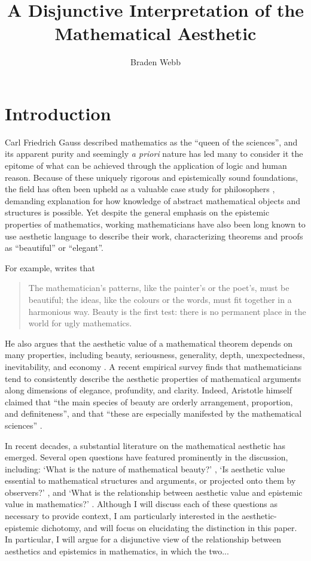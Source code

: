 \documentclass[a4paper,man,natbib]{apa6}
\title{A Disjunctive Interpretation of the Mathematical Aesthetic}
\author{Braden Webb}
\affiliation{Department of Philosophy, Brigham Young University\\
PHIL 495R: Directed Readings in the Philosophy of Mathematics\\
Dr. Derek Haderlie\\
22 April 2023}
\begin{document}
\maketitle

\section{Introduction}
Carl Friedrich Gauss described mathematics as the ``queen of the sciences'', and its apparent purity and 
seemingly \textit{a priori} nature has led many to consider it the epitome of what can be achieved through
the application of logic and human reason. Because of these uniquely rigorous and epistemically sound
foundations, the field has often been upheld as a valuable case study for philosophers \citep{shapiro_thinking_2000},
demanding explanation for how knowledge of abstract mathematical objects and structures is possible. 
Yet despite the general emphasis on the epistemic properties of mathematics, working mathematicians have 
also been long known to use aesthetic language to describe their work, characterizing theorems and proofs as
``beautiful'' or ``elegant''. 

For example, \cite{hardy_mathematicians_1940} writes that
\begin{quotation}
      The mathematician’s patterns, like the painter’s or the poet’s, must be beautiful; the ideas, like the 
      colours or the words, must fit together in a harmonious way. Beauty is the first test: there is no 
      permanent place in the world for ugly mathematics.
\end{quotation}
He also argues that the aesthetic value of a mathematical theorem depends on many properties, including
beauty, seriousness, generality, depth, unexpectedness, inevitability, and 
economy \citep{hardy_mathematicians_1940}. A recent empirical survey \citep{johnson_intuitions_2019} finds that mathematicians
tend to consistently describe the aesthetic properties of mathematical arguments along dimensions of
elegance, profundity, and clarity. Indeed, Aristotle himself claimed that ``the main species of beauty are orderly 
arrangement, proportion, and definiteness'', and that ``these are especially manifested by the mathematical sciences''
\cite[VIII, 1078a]{aristotle_metaphysics_nodate}.

In recent decades, a substantial literature on the mathematical aesthetic has emerged. Several open questions have
featured prominently in the discussion, including: `What is the nature of mathematical beauty?' 
\citep{blasjo_definition_2012,cellucci_mathematical_2015}, `Is aesthetic value essential to mathematical structures
and arguments, or projected onto them by observers?' \citep{mcallister_mathematical_2005}, and `What is the relationship
between aesthetic value and epistemic value in mathematics?' \citep{todd_unmasking_2008,todd_fitting_2018}. Although
I will discuss each of these questions as necessary to provide context, I am particularly interested in the 
aesthetic-epistemic dichotomy, and will focus on elucidating the distinction in this paper. In particular, I will argue for a
disjunctive view of the relationship between aesthetics and epistemics in mathematics, in which the two...
\end{document}
